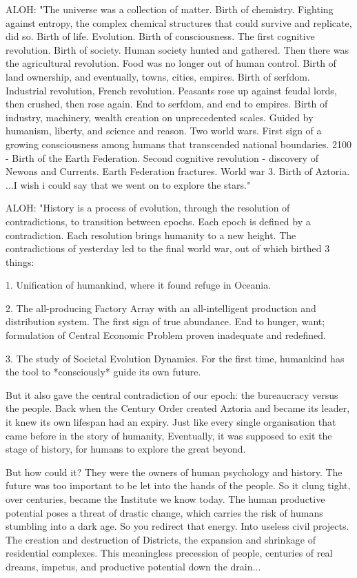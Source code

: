 \documentclass[11pt]{article}
\begin{document}
ALOH: "The universe was a collection of matter.
Birth of chemistry.
Fighting against entropy, the complex chemical structures that could survive and replicate, did so.
Birth of life.
Evolution.
Birth of consciousness.
The first cognitive revolution.
Birth of society.
Human society hunted and gathered.
Then there was the agricultural revolution.
Food was no longer out of human control.
Birth of land ownership, and eventually, towns, cities, empires.
Birth of serfdom.
Industrial revolution, French revolution. 
Peasants rose up against feudal lords, then crushed, then rose again. End to serfdom, and end to empires.
Birth of industry, machinery, wealth creation on unprecedented scales.
Guided by humanism, liberty, and science and reason.
Two world wars.
First sign of a growing consciousness among humans that transcended national boundaries.
2100 - Birth of the Earth Federation.
Second cognitive revolution - discovery of Newons and Currents.
Earth Federation fractures. 
World war 3.
Birth of Aztoria.
...I wish i could say that we went on to explore the stars."

ALOH: "History is a process of evolution, through the resolution of contradictions, to transition between epochs.
Each epoch is defined by a contradiction.
Each resolution brings humanity to a new height.
The contradictions of yesterday led to the final world war, out of which birthed 3 things:

1. Unification of humankind, where it found refuge in Oceania.

2. The all-producing Factory Array with an all-intelligent production and distribution system. The first sign of true abundance. End to hunger, want; formulation of Central Economic Problem proven inadequate and redefined.

3. The study of Societal Evolution Dynamics. For the first time, humankind has the tool to *consciously* guide its own future.

But it also gave the central contradiction of our epoch: the bureaucracy versus the people. 
Back when the Century Order created Aztoria and became its leader, it knew its own lifespan had an expiry. 
Just like every single organisation that came before in the story of humanity,
Eventually, it was supposed to exit the stage of history, for humans to explore the great beyond.

But how could it? 
They were the owners of human psychology and history.
The future was too important to be let into the hands of the people.
So it clung tight, over centuries, became the Institute we know today.
The human productive potential poses a threat of drastic change, which carries the risk of humans stumbling into a dark age.
So you redirect that energy.
Into useless civil projects.
The creation and destruction of Districts, the expansion and shrinkage of residential complexes.
This meaningless precession of people, centuries of real dreams, impetus, and productive potential down the drain...
\end{document}

